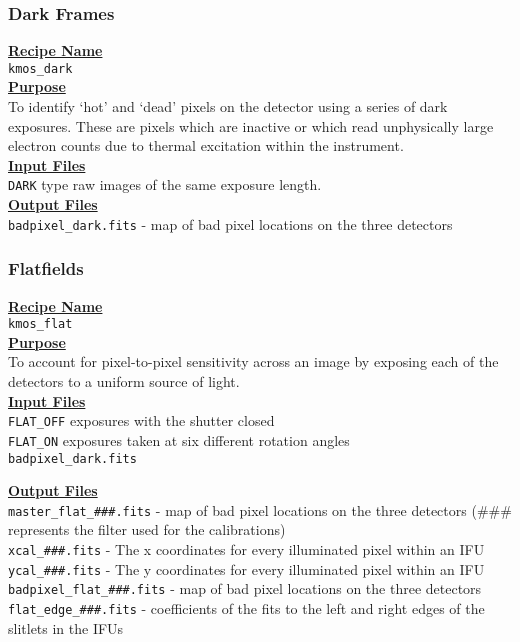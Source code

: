 \documentclass{literature}
\begin{document}
\subsubsection{Dark Frames}\label{subsubsec:dark_frames}
\textbf{\underline{Recipe Name}} \\		
\noindent
{\tt{kmos\_dark}} \\

\noindent
\textbf{\underline{Purpose}} \\	
\noindent 
To identify `hot' and `dead' pixels on the detector using a series of dark exposures. These are pixels which are inactive or which 
read unphysically large electron counts due to thermal excitation within the instrument. \\

\noindent
\textbf{\underline{Input Files}} \\	
 {\tt{DARK}} type raw images of the same exposure length. \\ 

\noindent
\textbf{\underline{Output Files}} \\	
\noindent
{\tt{badpixel\_dark.fits}} - map of bad pixel locations on the three detectors \\

\subsubsection{Flatfields}\label{subsubsec:flatfields}
\textbf{\underline{Recipe Name}} \\		
\noindent
{\tt{kmos\_flat}} \\


\noindent
\textbf{\underline{Purpose}} \\	
\noindent 
To account for pixel-to-pixel sensitivity across an image by exposing each of the detectors to a uniform source of light.\\

\noindent
\textbf{\underline{Input Files}} \\	
 {\tt{FLAT\_OFF}} exposures with the shutter closed \\ 
 {\tt{FLAT\_ON}} exposures taken at six different rotation angles \\
\noindent 
{\tt{badpixel\_dark.fits}}

\noindent
\textbf{\underline{Output Files}} \\	
\noindent
{\tt{master\_flat\_\#\#\#.fits}} - map of bad pixel locations on the three detectors (\#\#\# represents the filter used for the calibrations)\\
\noindent
{\tt{xcal\_\#\#\#.fits}} - The x coordinates for every illuminated pixel within an IFU\\
\noindent
{\tt{ycal\_\#\#\#.fits}} - The y coordinates for every illuminated pixel within an IFU\\
\noindent
{\tt{badpixel\_flat\_\#\#\#.fits}} - map of bad pixel locations on the three detectors\\
\noindent
{\tt{flat\_edge\_\#\#\#.fits}} - coefficients of the fits to the left and right edges of the slitlets in the IFUs
\end{document}

